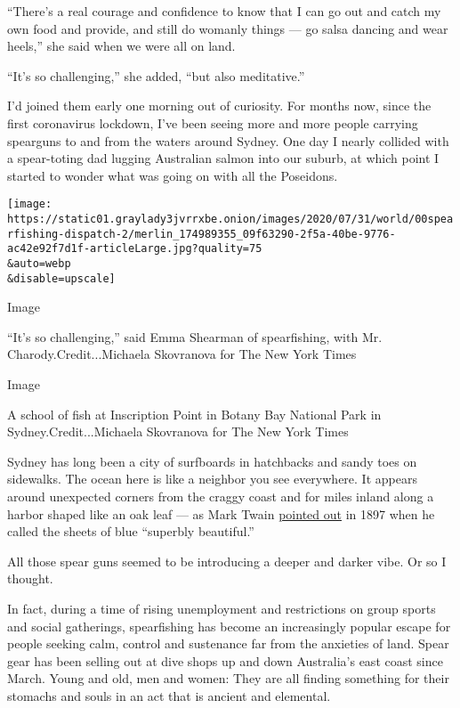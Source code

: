 ``There's a real courage and confidence to know that I can go out and
catch my own food and provide, and still do womanly things --- go salsa
dancing and wear heels,'' she said when we were all on land.

``It's so challenging,'' she added, ``but also meditative.''

I'd joined them early one morning out of curiosity. For months now,
since the first coronavirus lockdown, I've been seeing more and more
people carrying spearguns to and from the waters around Sydney. One day
I nearly collided with a spear-toting dad lugging Australian salmon into
our suburb, at which point I started to wonder what was going on with
all the Poseidons.

\texttt{[image: https://static01.graylady3jvrrxbe.onion/images/2020/07/31/world/00spearfishing-dispatch-2/merlin\_174989355\_09f63290-2f5a-40be-9776-ac42e92f7d1f-articleLarge.jpg?quality=75\\\&auto=webp\\\&disable=upscale]}

Image

``It's so challenging,'' said Emma Shearman of spearfishing, with Mr.
Charody.Credit...Michaela Skovranova for The New York Times

Image

A school of fish at Inscription Point in Botany Bay National Park in
Sydney.Credit...Michaela Skovranova for The New York Times

Sydney has long been a city of surfboards in hatchbacks and sandy toes
on sidewalks. The ocean here is like a neighbor you see everywhere. It
appears around unexpected corners from the craggy coast and for miles
inland along a harbor shaped like an oak leaf --- as Mark Twain
\href{https://musingsofaliterarydilettante.wordpress.com/2010/03/28/the-wayward-tourist-mark-twains-adventures-in-australia-by-mark-twain/}{pointed
out} in 1897 when he called the sheets of blue ``superbly beautiful.''

All those spear guns seemed to be introducing a deeper and darker vibe.
Or so I thought.

In fact, during a time of rising unemployment and restrictions on group
sports and social gatherings, spearfishing has become an increasingly
popular escape for people seeking calm, control and sustenance far from
the anxieties of land. Spear gear has been selling out at dive shops up
and down Australia's east coast since March. Young and old, men and
women: They are all finding something for their stomachs and souls in an
act that is ancient and elemental.

